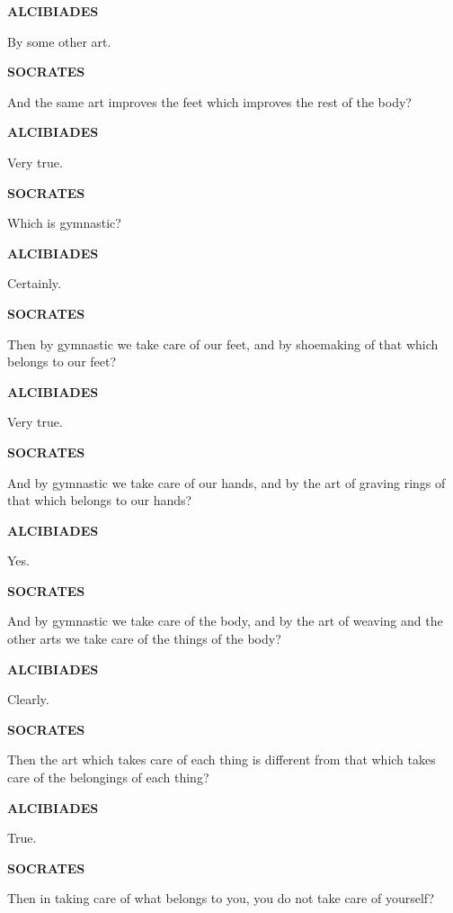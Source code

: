 \documentclass[11pt,letter]{article}
\begin{document}
\par \textbf{ALCIBIADES}
\par   By some other art.

\par \textbf{SOCRATES}
\par   And the same art improves the feet which improves the rest of the body?

\par \textbf{ALCIBIADES}
\par   Very true.

\par \textbf{SOCRATES}
\par   Which is gymnastic?

\par \textbf{ALCIBIADES}
\par   Certainly.

\par \textbf{SOCRATES}
\par   Then by gymnastic we take care of our feet, and by shoemaking of that which belongs to our feet?

\par \textbf{ALCIBIADES}
\par   Very true.

\par \textbf{SOCRATES}
\par   And by gymnastic we take care of our hands, and by the art of graving rings of that which belongs to our hands?

\par \textbf{ALCIBIADES}
\par   Yes.

\par \textbf{SOCRATES}
\par   And by gymnastic we take care of the body, and by the art of weaving and the other arts we take care of the things of the body?

\par \textbf{ALCIBIADES}
\par   Clearly.

\par \textbf{SOCRATES}
\par   Then the art which takes care of each thing is different from that which takes care of the belongings of each thing?

\par \textbf{ALCIBIADES}
\par   True.

\par \textbf{SOCRATES}
\par   Then in taking care of what belongs to you, you do not take care of yourself?
\end{document}
